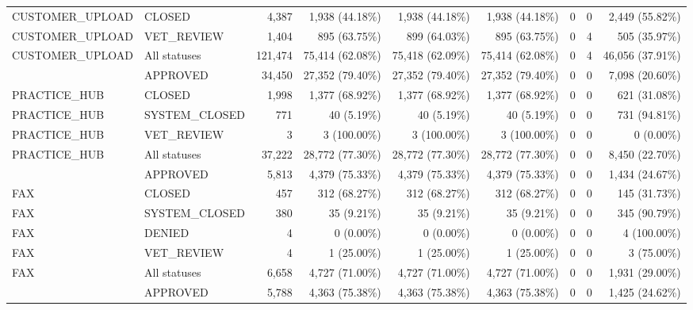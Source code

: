 \begin{longtable}{@{}llrrrrrrr@{}}
{CUSTOMER\_UPLOAD} & {CLOSED} & 4,387 & 1,938 (44.18\%) & 1,938 (44.18\%) & 1,938 (44.18\%) & 0 & 0 & 2,449 (55.82\%) \\

{CUSTOMER\_UPLOAD} & {VET\_REVIEW} & 1,404 & 895 (63.75\%) & 899 (64.03\%) & 895 (63.75\%) & 0 & 4 & 505 (35.97\%) \\
\midrule
{CUSTOMER\_UPLOAD} & {All statuses} & 121,474 & 75,414 (62.08\%) & 75,418 (62.09\%) & 75,414 (62.08\%) & 0 & 4 & 46,056 (37.91\%) \\
\addlinespace[2pt]
{PRACTICE\_HUB} & {APPROVED} & 34,450 & 27,352 (79.40\%) & 27,352 (79.40\%) & 27,352 (79.40\%) & 0 & 0 & 7,098 (20.60\%) \\

{PRACTICE\_HUB} & {CLOSED} & 1,998 & 1,377 (68.92\%) & 1,377 (68.92\%) & 1,377 (68.92\%) & 0 & 0 & 621 (31.08\%) \\

{PRACTICE\_HUB} & {SYSTEM\_CLOSED} & 771 & 40 (5.19\%) & 40 (5.19\%) & 40 (5.19\%) & 0 & 0 & 731 (94.81\%) \\

{PRACTICE\_HUB} & {VET\_REVIEW} & 3 & 3 (100.00\%) & 3 (100.00\%) & 3 (100.00\%) & 0 & 0 & 0 (0.00\%) \\
\midrule
{PRACTICE\_HUB} & {All statuses} & 37,222 & 28,772 (77.30\%) & 28,772 (77.30\%) & 28,772 (77.30\%) & 0 & 0 & 8,450 (22.70\%) \\
\addlinespace[2pt]
{FAX} & {APPROVED} & 5,813 & 4,379 (75.33\%) & 4,379 (75.33\%) & 4,379 (75.33\%) & 0 & 0 & 1,434 (24.67\%) \\

{FAX} & {CLOSED} & 457 & 312 (68.27\%) & 312 (68.27\%) & 312 (68.27\%) & 0 & 0 & 145 (31.73\%) \\

{FAX} & {SYSTEM\_CLOSED} & 380 & 35 (9.21\%) & 35 (9.21\%) & 35 (9.21\%) & 0 & 0 & 345 (90.79\%) \\

{FAX} & {DENIED} & 4 & 0 (0.00\%) & 0 (0.00\%) & 0 (0.00\%) & 0 & 0 & 4 (100.00\%) \\

{FAX} & {VET\_REVIEW} & 4 & 1 (25.00\%) & 1 (25.00\%) & 1 (25.00\%) & 0 & 0 & 3 (75.00\%) \\
\midrule
{FAX} & {All statuses} & 6,658 & 4,727 (71.00\%) & 4,727 (71.00\%) & 4,727 (71.00\%) & 0 & 0 & 1,931 (29.00\%) \\
\addlinespace[2pt]
{CLINIC\_EMAIL} & {APPROVED} & 5,788 & 4,363 (75.38\%) & 4,363 (75.38\%) & 4,363 (75.38\%) & 0 & 0 & 1,425 (24.62\%) \\


\end{longtable}
